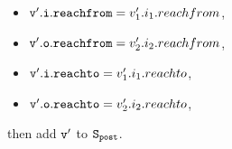 \begin{itemize}
\begin{enumerate}
\begin{itemize}
\item $\mathtt{v}'.\mathtt{i}.\mathtt{reachfrom} = v_1'.i_1.reachfrom$,
\item $\mathtt{v}'.\mathtt{o}.\mathtt{reachfrom} = v_2'.i_2.reachfrom$,
\item $\mathtt{v}'.\mathtt{i}.\mathtt{reachto} = v_1'.i_1.reachto$,
\item $\mathtt{v}'.\mathtt{o}.\mathtt{reachto} = v_2'.i_2.reachto$,
\end{itemize} then add $\tt v'$ to $\tt S_{post}$. 
\end{enumerate}
%

\end{itemize}

